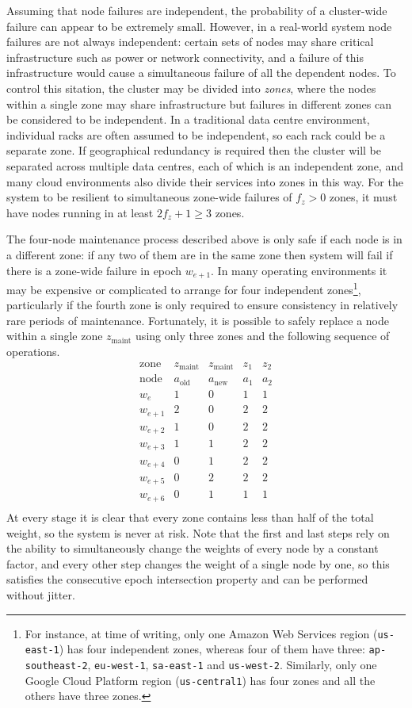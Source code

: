 \documentclass[journal]{IEEEtran}
\begin{document}
Assuming that node failures are independent, the probability of a cluster-wide
failure can appear to be extremely small. However, in a real-world system node
failures are not always independent: certain sets of nodes may share critical
infrastructure such as power or network connectivity, and a failure of this
infrastructure would cause a simultaneous failure of all the dependent nodes.
To control this sitation, the cluster may be divided into \textit{zones}, where
the nodes within a single zone may share infrastructure but failures in
different zones can be considered to be independent. In a traditional data
centre environment, individual racks are often assumed to be independent, so
each rack could be a separate zone. If geographical redundancy is required then
the cluster will be separated across multiple data centres, each of which is an
independent zone, and many cloud environments also divide their services into
zones in this way.  For the system to be resilient to simultaneous zone-wide
failures of $f_z > 0$ zones, it must have nodes running in at least $2f_z + 1
\ge 3$ zones.

The four-node maintenance process described above is only safe if each node is
in a different zone: if any two of them are in the same zone then system will
fail if there is a zone-wide failure in epoch $w_{e+1}$.  In many operating
environments it may be expensive or complicated to arrange for four independent
zones\footnote{For instance, at time of writing, only one Amazon Web Services
region (\texttt{us-east-1}) has four independent zones, whereas four of them
have three: \texttt{ap-southeast-2}, \texttt{eu-west-1}, \texttt{sa-east-1} and
\texttt{us-west-2}. Similarly, only one Google Cloud Platform region
(\texttt{us-central1}) has four zones and all the others have three zones.},
particularly if the fourth zone is only required to ensure consistency in
relatively rare periods of maintenance.  Fortunately, it is possible to safely
replace a node within a single zone $z_{\textrm{maint}}$ using only three zones
and the following sequence of operations.
\[\begin{array}{rcccc}
\textrm{zone}&z_{\textrm{maint}}&z_{\textrm{maint}}&z_1&z_2\\
\textrm{node}&a_{\textrm{old}}&a_{\textrm{new}}&a_1&a_2\\
w_e&1&0&1&1\\
w_{e+1}&2&0&2&2\\
w_{e+2}&1&0&2&2\\
w_{e+3}&1&1&2&2\\
w_{e+4}&0&1&2&2\\
w_{e+5}&0&2&2&2\\
w_{e+6}&0&1&1&1\\
\end{array}\]
At every stage it is clear that every zone contains less than half of the total
weight, so the system is never at risk. Note that the first and last steps rely
on the ability to simultaneously change the weights of every node by a constant
factor, and every other step changes the weight of a single node by one, so
this satisfies the consecutive epoch intersection property and can be performed
without jitter.
\end{document}
